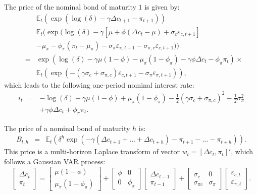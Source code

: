\documentclass[
  12pt,
]{book}
\theoremstyle{definition}
\theoremstyle{definition}
\theoremstyle{definition}
\theoremstyle{definition}
\theoremstyle{remark}
\begin{document}
The price of the nominal bond of maturity \(1\) is given by:
\begin{eqnarray*}
&&\mathbb{E}_t(\exp(\log(\delta) -\gamma \Delta c_{t+1}-\pi_{t+1}))\\
&=& \mathbb{E}_t(\exp(\log(\delta)-\gamma [\mu + \phi (\Delta c_t - \mu) + \sigma_c \varepsilon_{c,t+1}] \\
&& - \mu_\pi - \phi_\pi (\pi_{t} - \mu_\pi) - \sigma_\pi \varepsilon_{\pi,t+1} - \sigma_{\pi,c}\varepsilon_{c,t+1}))\\
&=& \exp(\log(\delta)-\gamma \mu (1-\phi) - \mu_\pi(1-\phi_\pi)-\gamma \phi \Delta c_t - \phi_\pi \pi_{t}) \times \\
&& \mathbb{E}_t(\exp( - (\gamma \sigma_c+\sigma_{\pi,c}) \varepsilon_{c,t+1}  - \sigma_\pi \varepsilon_{\pi,t+1})),
\end{eqnarray*}
which leads to the following one-period nominal interest rate:
\begin{eqnarray}
i_t &=& - \log(\delta) +\gamma \mu (1-\phi) + \mu_\pi(1-\phi_\pi) - \frac{1}{2}(\gamma \sigma_c+\sigma_{\pi,c})^2 - \frac{1}{2}\sigma_\pi^2 \nonumber\\ 
&& + \gamma \phi \Delta c_t + \phi_\pi \pi_{t}. \label{eq:nominalCCAPM}
\end{eqnarray}

The price of a nominal bond of maturity \(h\) is:
\begin{eqnarray*}
B_{t,h} &=& \mathbb{E}_t(\delta^{h}\exp(-\gamma (\Delta c_{t+1}+\dots+\Delta c_{t+h}) - \pi_{t+1}-\dots-\pi_{t+h})).
\end{eqnarray*}
This price is a multi-horizon Laplace transform of vector \(w_t = [\Delta c_t,\pi_t]'\), which follows a Gaussian VAR process:
\[
\left[\begin{array}{c}\Delta c_t\\
\pi_t\end{array}\right] = 
\left[\begin{array}{c} \mu (1-\phi)\\
\mu_\pi(1-\phi_\pi)\end{array}\right]+
\left[\begin{array}{cc} \phi & 0\\
0 & \phi_\pi\end{array}\right]\left[\begin{array}{c}\Delta c_{t-1}\\
\pi_{t-1}\end{array}\right]+
\left[\begin{array}{cc} \sigma_c & 0\\
\sigma_{\pi c} & \sigma_\pi\end{array}\right]\left[\begin{array}{c}\varepsilon_{c,t}\\
\varepsilon_{\pi,t}\end{array}\right].
\]
\end{document}
